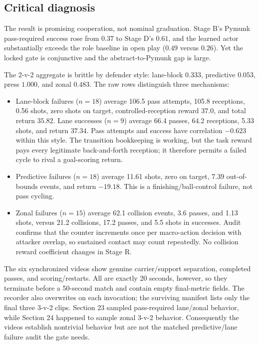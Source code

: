 \documentclass[12pt,twocolumn]{article}
\begin{document}
\subsection{Critical diagnosis}
The result is promising cooperation, not nominal graduation. Stage B's Pymunk pass-required
success rose from $0.37$ to Stage D's $0.61$, and the learned actor substantially exceeds the
role baseline in open play ($0.49$ versus $0.26$). Yet the locked gate is conjunctive and the
abstract-to-Pymunk gap is large.

The 2-v-2 aggregate is brittle by defender style: lane-block $0.333$, predictive $0.053$, press
$1.000$, and zonal $0.483$. The raw rows distinguish three mechanisms:
\begin{itemize}
\item Lane-block failures ($n=18$) average 106.5 pass attempts, 105.8 receptions, 0.56 shots, zero
shots on target, controlled-reception reward $37.0$, and total return $35.82$. Lane successes
($n=9$) average 66.4 passes, 64.2 receptions, 5.33 shots, and return $37.34$. Pass attempts and
success have correlation $-0.623$ within this style. The transition bookkeeping is working, but
the task reward pays every legitimate back-and-forth reception; it therefore permits a failed
cycle to rival a goal-scoring return.
\item Predictive failures ($n=18$) average 11.61 shots, zero on target, 7.39 out-of-bounds events,
and return $-19.18$. This is a finishing/ball-control failure, not pass cycling.
\item Zonal failures ($n=15$) average 62.1 collision events, 3.6 passes, and 1.13 shots, versus
21.2 collisions, 17.2 passes, and 5.5 shots in successes. Audit confirms that the counter
increments once per macro-action decision with attacker overlap, so sustained contact may count
repeatedly. No collision reward coefficient changes in Stage R.
\end{itemize}

The six synchronized videos show genuine carrier/support separation, completed passes, and
scoring/restarts. All are exactly 20 seconds, however, so they terminate before a 50-second match
and contain empty final-metric fields. The recorder also overwrites
 on each invocation; the surviving manifest lists only the final three
3-v-2 clips. Section 23 sampled pass-required lane/zonal behavior, while Section 24 happened to
sample zonal 3-v-2 behavior. Consequently the videos establish nontrivial behavior but are not
the matched predictive/lane failure audit the gate needs.
\end{document}
